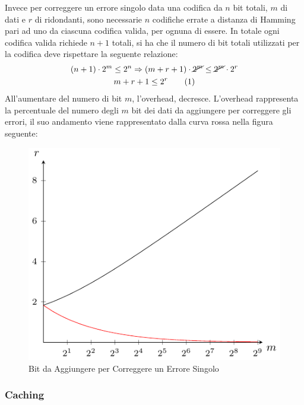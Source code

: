\documentclass{article}
\numberwithin{equation}{subsection}
\newcommand{\tageq}{\tag{\stepcounter{equation}\theequation}}
\begin{document}
Invece per correggere un errore singolo data una codifica da $n$ bit totali, $m$ di dati e $r$ di ridondanti, sono necessarie $n$ codifiche errate a distanza di Hamming pari ad uno da ciascuna codifica valida, 
per ognuna di essere. In totale ogni codifica valida richiede $n+1$ totali, si ha che il numero di bit totali utilizzati per la codifica deve rispettare la seguente relazione:
\begin{gather*}
    (n+1)\cdot2^m\leq2^n\Rightarrow(m+r+1)\cdot\cancel{2^m}\leq\cancel{2^m}\cdot2^r\\
    m+r+1\leq2^r\tageq
\end{gather*}  
All'aumentare del numero di bit $m$, l'overhead, decresce. L'overhead rappresenta la percentuale del numero degli $m$ bit dei dati da aggiungere per correggere gli errori, il suo andamento 
viene rappresentato dalla curva rossa nella figura seguente:
\begin{figure}[H]%
    \centering%
    \includegraphics{overhead.pdf}%
    \caption{Bit da Aggiungere per Correggere un Errore Singolo}%
    \label{fig:overhead}
\end{figure}

\subsubsection{Caching}
\end{document}
